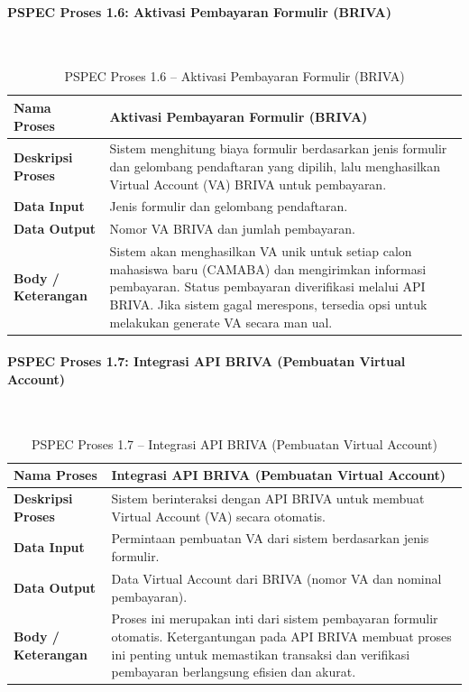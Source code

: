 \paragraph{PSPEC Proses 1.6: Aktivasi Pembayaran Formulir (BRIVA)}~\\
\begin{longtable}{|p{}|p{}|}
	\caption{PSPEC Proses 1.6 -- Aktivasi Pembayaran Formulir (BRIVA)}
	\label{table:3.pspec16}\\
	\hline
	\textbf{Nama Proses} & Aktivasi Pembayaran Formulir (BRIVA) \\
	\hline
	\textbf{Deskripsi Proses} & Sistem menghitung biaya formulir berdasarkan jenis formulir dan gelombang pendaftaran yang dipilih, lalu menghasilkan Virtual Account (VA) BRIVA untuk pembayaran. \\
	\hline
	\textbf{Data Input} & Jenis formulir dan gelombang pendaftaran. \\
	\hline
	\textbf{Data Output} & Nomor VA BRIVA dan jumlah pembayaran. \\
	\hline
	\textbf{Body / Keterangan} & Sistem akan menghasilkan VA unik untuk setiap calon mahasiswa baru (CAMABA) dan mengirimkan informasi pembayaran. Status pembayaran diverifikasi melalui API BRIVA. Jika sistem gagal merespons, tersedia opsi untuk melakukan generate VA secara man ual. \\
	\hline
\end{longtable}

\paragraph{PSPEC Proses 1.7: Integrasi API BRIVA (Pembuatan Virtual Account)}~\\
\begin{longtable}{|p{}|p{}|}
	\caption{PSPEC Proses 1.7 -- Integrasi API BRIVA (Pembuatan Virtual Account)}
	\label{table:3.pspec17}\\
	\hline
	\textbf{Nama Proses} & Integrasi API BRIVA (Pembuatan Virtual Account) \\
	\hline
	\textbf{Deskripsi Proses} & Sistem berinteraksi dengan API BRIVA untuk membuat Virtual Account (VA) secara otomatis. \\
	\hline
	\textbf{Data Input} & Permintaan pembuatan VA dari sistem berdasarkan jenis formulir. \\
	\hline
	\textbf{Data Output} & Data Virtual Account dari BRIVA (nomor VA dan nominal pembayaran). \\
	\hline
	\textbf{Body / Keterangan} & Proses ini merupakan inti dari sistem pembayaran formulir otomatis. Ketergantungan pada API BRIVA membuat proses ini penting untuk memastikan transaksi dan verifikasi pembayaran berlangsung efisien dan akurat. \\
	\hline
\end{longtable}

